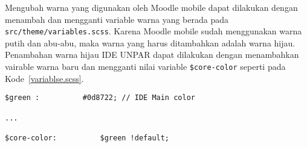 Mengubah warna yang digunakan oleh Moodle mobile dapat dilakukan dengan menambah dan mengganti variable warna yang berada pada \texttt{src/theme/variables.scss}. Karena Moodle mobile sudah menggunakan warna putih dan abu-abu, maka warna yang harus ditambahkan adalah warna hijau. Penambahan warna hijau IDE UNPAR dapat dilakukan dengan menambahkan vairable warna baru dan mengganti nilai variable \texttt{\$core-color} seperti pada \mbox{Kode \ref{variablse.scss}}.

\begin{lstlisting}[frame=single, label ={variable.scss}, caption = Mengubah warna utama menjadi warna hijau ]
$green :          #0d8722; // IDE Main color

... 

$core-color:          $green !default;
\end{lstlisting}